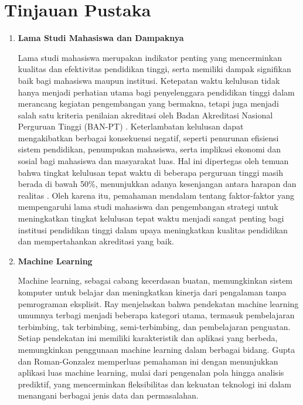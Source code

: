 \section{Tinjauan Pustaka}
\begin{enumerate}
    \item \textbf{Lama Studi Mahasiswa dan Dampaknya}
    
    Lama studi mahasiswa merupakan indikator penting yang mencerminkan kualitas dan efektivitas pendidikan tinggi, serta memiliki dampak signifikan baik bagi mahasiswa maupun institusi. Ketepatan waktu kelulusan tidak hanya menjadi perhatian utama bagi penyelenggara pendidikan tinggi dalam merancang kegiatan pengembangan yang bermakna, tetapi juga menjadi salah satu kriteria penilaian akreditasi oleh Badan Akreditasi Nasional Perguruan Tinggi (BAN-PT) \cite{wirawan2019application}. Keterlambatan kelulusan dapat mengakibatkan berbagai konsekuensi negatif, seperti penurunan efisiensi sistem pendidikan, penumpukan mahasiswa, serta implikasi ekonomi dan sosial bagi mahasiswa dan masyarakat luas. Hal ini dipertegas oleh temuan bahwa tingkat kelulusan tepat waktu di beberapa perguruan tinggi masih berada di bawah 50\%, menunjukkan adanya kesenjangan antara harapan dan realitas \cite{dengen2018student}. Oleh karena itu, pemahaman mendalam tentang faktor-faktor yang mempengaruhi lama studi mahasiswa dan pengembangan strategi untuk meningkatkan tingkat kelulusan tepat waktu menjadi sangat penting bagi institusi pendidikan tinggi dalam upaya meningkatkan kualitas pendidikan dan mempertahankan akreditasi yang baik.

    \item \textbf{Machine Learning}
    
    Machine learning, sebagai cabang kecerdasan buatan, memungkinkan sistem komputer untuk belajar dan meningkatkan kinerja dari pengalaman tanpa pemrograman eksplisit. Ray \cite{ray2019quick} menjelaskan bahwa pendekatan machine learning umumnya terbagi menjadi beberapa kategori utama, termasuk pembelajaran terbimbing, tak terbimbing, semi-terbimbing, dan pembelajaran penguatan. Setiap pendekatan ini memiliki karakteristik dan aplikasi yang berbeda, memungkinkan penggunaan machine learning dalam berbagai bidang. Gupta dan Roman-Gonzalez \cite{gupta2020survey} memperluas pemahaman ini dengan menunjukkan aplikasi luas machine learning, mulai dari pengenalan pola hingga analisis prediktif, yang mencerminkan fleksibilitas dan kekuatan teknologi ini dalam menangani berbagai jenis data dan permasalahan.


\end{enumerate}
